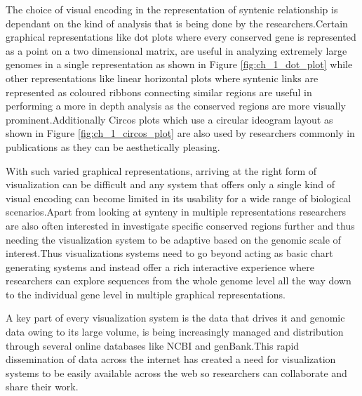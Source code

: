 The choice of visual encoding in the representation of syntenic relationship is dependant on the kind of analysis that is being done by the researchers.Certain graphical representations like dot plots where every conserved gene is represented as a point on a two dimensional matrix, are useful in analyzing extremely large genomes in a single representation as shown in Figure \ref{fig:ch_1_dot_plot} while other representations like linear horizontal plots where syntenic links are represented as coloured ribbons connecting similar regions are useful in performing a more in depth analysis as the conserved regions are more visually prominent.Additionally Circos plots which use a circular ideogram layout as shown in Figure \ref{fig:ch_1_circos_plot} are also used by researchers commonly in publications as they can be aesthetically pleasing.

With such varied graphical representations, arriving at the right form of visualization can be difficult and any system that offers only a single kind of visual encoding can become limited in its usability for a wide range of biological scenarios.Apart from looking at synteny in multiple representations researchers are also often interested in  investigate specific conserved regions further and thus needing the visualization system to be adaptive based on the genomic scale of interest.Thus visualizations systems need to go beyond acting as basic chart generating systems and instead offer a rich interactive experience where researchers can explore sequences from the whole genome level all the way down to the individual gene level in multiple graphical representations.

A key part of every visualization system is the data that drives it and genomic data owing to its large volume, is being increasingly managed and distribution through several online databases like NCBI and genBank.This rapid dissemination of data across the internet has created a need for visualization systems to be easily available across the web so researchers can collaborate and share their work.


